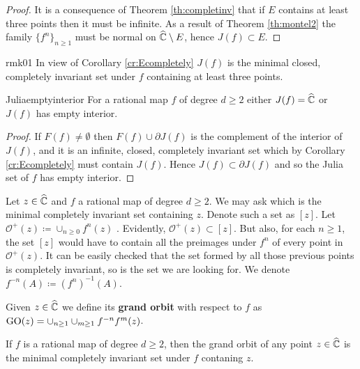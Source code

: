 \begin{proof}
It is a consequence of Theorem \ref{th:completinv} that if $E$ contains at least three points then it must be infinite. As a result of Theorem \ref{th:montel2} the family $\{f^n\}_{n\geq 1}$ must be normal on $\widehat{\mathbb{C}}\setminus E$, hence $J(f)\subset E$.
\end{proof}

\begin{myrmk}{}{rmk01}
In view of Corollary \ref{cr:Ecompletely} $J(f)$ is the minimal closed, completely invariant set under $f$ containing at least three points.\\
\end{myrmk}

\begin{mycoro}{}{Juliaemptyinterior}
For a rational map $f$ of degree $d\geq 2$ either $J(f)=\widehat{\mathbb{C}}$ or $J(f)$ has empty interior.
\end{mycoro}

\begin{proof}
If $F(f)\neq \emptyset$ then $F(f)\cup \partial J(f)$ is the complement of the interior of $J(f)$, and it is an infinite, closed, completely invariant set which by Corollary \ref{cr:Ecompletely} must contain $J(f)$. Hence $J(f)\subset \partial J(f)$ and so the Julia set of $f$ has empty interior.
\end{proof}

Let $z\in \widehat{\mathbb{C}}$ and $f$ a rational map of degree $d\geq 2$. We may ask which is the minimal completely invariant set containing $z$. Denote such a set as $[z]$. Let $\mathcal{O}^+(z) \coloneqq \cup_{n\geq 0} f^n(z)$ . Evidently, $\mathcal{O}^+(z) \subset [z]$. But also, for each $n\geq 1$, the set $[z]$ would have to contain all the preimages under $f^n$ of every point in $\mathcal{O}^+(z)$. It can be easily checked that the set formed by all those previous points is completely invariant, so is the set we are looking for. We denote $f^{-n}(A) \coloneqq (f^{n})^{-1}(A)$.

\begin{mydef}{}{}
Given $z\in\widehat{\mathbb{C}}$ we define its {\bf grand orbit} with respect to $f$ as $\text{GO}(z) = \cup_{n\geq 1}\cup_{m\geq 1}f^{-n}f^m(z)$. 
\end{mydef}

\begin{myprop}
If $f$ is a rational map of degree $d\geq 2$, then the grand orbit of any point $z\in \widehat{\mathbb{C}}$ is the minimal completely invariant set under $f$ contaning $z$.
\end{myprop}

